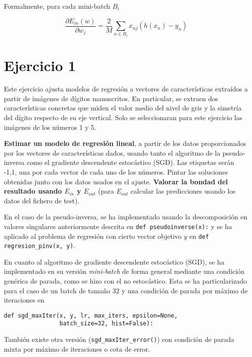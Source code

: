 Formalmente, para cada mini-batch $B_i$ 

\begin{equation*}
  \frac{\partial E_{in}(w)}{\partial w_j} = \frac{2}{M} \sum_{n \in B_i} x_{nj} (h(x_n) - y_n)
\end{equation*}

\section{Ejercicio 1}

Este ejercicio ajusta modelos de regresión a vectores de características
extraídos a partir de imágenes de dígitos manuscritos. En particular, se
extraen dos características concretas que miden el valor medio del nivel de
gris y la simetría del dígito respecto de su eje vertical. Solo se
seleccionaran para este ejercicio las imágenes de los números 1 y 5.

\textbf{Estimar un modelo de regresión lineal}, a partir de los datos proporcionados
por los vectores de características dados, usando tanto el algoritmo de la
pseudo-inversa como el gradiente descendente estocástico (SGD). Las etiquetas
serán {-1,1}, una por cada vector de cada uno de los números. Pintar las
soluciones obtenidas junto con los datos usados en el ajuste. \textbf{Valorar la
bondad del resultado usando $E_{in}$ y $E_{out}$} (para $E_{out}$ calcular las
predicciones usando los datos del fichero de test).

\hfill \break

En el caso de la pseudo-inversa, se ha implementado usando la descomposición en
valores singulares anteriormente descrita en \texttt{def pseudoinverse(x):}
y se ha aplicado al problema de regresión con cierto vector objetivo $y$ en 
\texttt{def regresion_pinv(x, y)}.

En cuanto al algoritmo de gradiente descendente estocástico (SGD), se ha implementado
en su versión \textit{mini-batch} de forma general mediante una condición genérica de
parada, como se hizo con el no estocástico. Esta se ha particularizado para el caso 
de un batch de tamaño $32$ y una condición de parada por máximo de iteraciones en 

\begin{verbatim}
def sgd_maxIter(x, y, lr, max_iters, epsilon=None, 
                batch_size=32, hist=False):
\end{verbatim}

También existe otra versión (\texttt{sgd_maxIter_error()}) con
condición de parada mixta por máximo de iteraciones o cota de error.

